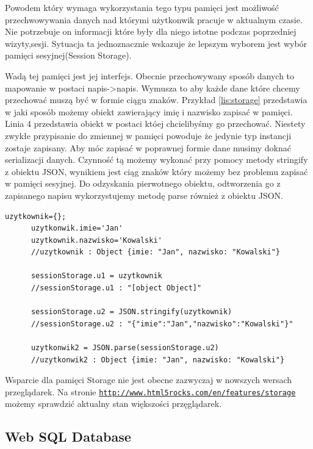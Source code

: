 Powodem który wymaga wykorzystania tego typu pamięci jest możliwość przechwowywania danych nad którymi użytkonwik pracuje w aktualnym czasie. Nie potrzebuje on informacji które były dla niego istotne podczas poprzedniej wizyty,sesji. Sytuacja ta jednoznacznie wskazuje że lepszym wyborem jest wybór pamięci sesyjnej(Session Storage).


Wadą tej pamięci jest jej interfejs. Obecnie przechowywany sposób danych to mapowanie w postaci napis->napis. Wymusza to aby każde dane które chcemy przechować muszą być w formie ciągu znaków. Przykład \ref{lis:storage} przedstawia w jaki sposób możemy obiekt zawierający imię i nazwisko zapisać w pamięci. Linia 4 przedstawia obiekt w postaci któej chcielibyśmy go przechować. Niestety zwykłe przypisanie do zmiennej w pamięci powoduje że jedynie typ instancji zostaje zapisany. Aby móc zapisać w poprawnej formie dane musimy doknać serializacji danych. Czynność tą możemy wykonać przy pomocy metody stringify z obiektu JSON, wynikiem jest ciąg znaków który możemy bez problemu zapisać w pamięci sesyjnej. Do odzyskania pierwotnego obiektu, odtworzenia go z zapisanego napisu wykorzystujemy metodę parse również z obiektu JSON.

\lstset{language=JavaScript}
\label{lis:storage}
\begin{lstlisting}[caption=json]
      uzytkownik={};
      uzytkonwik.imie='Jan'
      uzytkownik.nazwisko='Kowalski'
      //uzytkownik : Object {imie: "Jan", nazwisko: "Kowalski"}

      sessionStorage.u1 = uzytkownik
      //sessionStorage.u1 : "[object Object]"

      sessionStorage.u2 = JSON.stringify(uzytkownik)
      //sessionStorage.u2 : "{"imie":"Jan","nazwisko":"Kowalski"}"

      uzytkonwik2 = JSON.parse(sessionStorage.u2)
      //uzytkonwik2 : Object {imie: "Jan", nazwisko: "Kowalski"}
\end{lstlisting}



Wsparcie dla pamięci Storage nie jest obecne zazwyczaj w nowszych wersach przeglądarek. Na stronie \underline{\texttt{http://www.html5rocks.com/en/features/storage}} możemy sprawdzić aktualny stan większości przęglądarek.

\subsection{Web SQL Database}
\label{subsec:websql}

